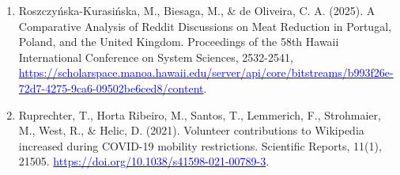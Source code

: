 \documentclass[aspectratio=169]{beamer}
\begin{document}
\begin{frame}
\begin{enumerate}
        \item Roszczyńska-Kurasińska, M., Biesaga, M., \& de Oliveira, C. A. (2025). A Comparative Analysis of Reddit Discussions on Meat Reduction in Portugal, Poland, and the United Kingdom. Proceedings of the 58th Hawaii International Conference on System Sciences, 2532-2541, \href{https://scholarspace.manoa.hawaii.edu/server/api/core/bitstreams/b993f26e-72d7-4275-9ca6-09502be6ced8/content}{\textcolor{blue}{https://scholarspace.manoa.hawaii.edu/server/api/core/bitstreams/b993f26e-72d7-4275-9ca6-09502be6ced8/content}}.
        \item Ruprechter, T., Horta Ribeiro, M., Santos, T., Lemmerich, F., Strohmaier, M., West, R., \& Helic, D. (2021). Volunteer contributions to Wikipedia increased during COVID-19 mobility restrictions. Scientific Reports, 11(1), 21505. \href{https://doi.org/10.1038/s41598-021-00789-3}{\textcolor{blue}{https://doi.org/10.1038/s41598-021-00789-3}}.
    \end{enumerate}
    
\end{frame}
\end{document}
